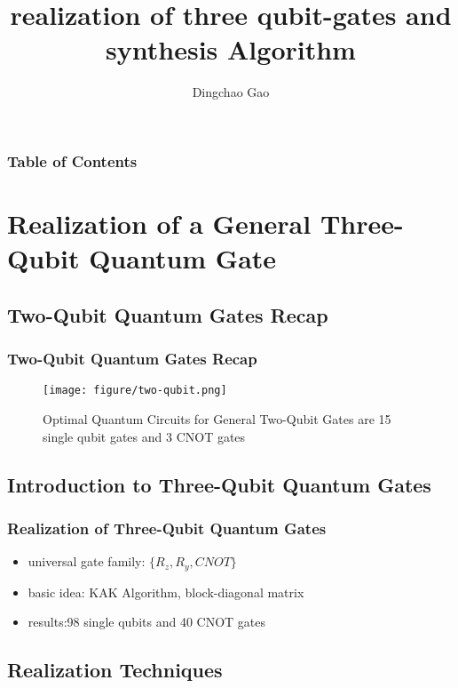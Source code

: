 \documentclass[aspectratio=1610]{beamer}
\title[gates \& synthesis]{realization of three qubit-gates and synthesis Algorithm}
\author[Gcc]{Dingchao Gao}
\institute[ISCAS]{Institute of Software Chinese Academy of Sciences}
\begin{document}
\frame{\titlepage}

\begin{frame}
\frametitle{Table of Contents}
\tableofcontents[hideallsubsections]
\end{frame}


\section{Realization of a General Three-Qubit Quantum Gate}
\subsection{Two-Qubit Quantum Gates Recap}
\begin{frame}
\frametitle{Two-Qubit Quantum Gates Recap}
\begin{figure}
  \texttt{[image: figure/two-qubit.png]}
  \caption{Optimal Quantum Circuits for General Two-Qubit Gates are 15 single qubit gates and 3 CNOT gates\cite{two}}
\end{figure}
\end{frame}

\subsection{Introduction to Three-Qubit Quantum Gates}
\begin{frame}
\frametitle{Realization of Three-Qubit Quantum Gates}
\begin{itemize}
  \item universal gate family: $\{R_z,R_y,CNOT\}$
  \item basic idea: KAK Algorithm\cite{kak}, block-diagonal matrix
  \item results:98 single qubits and 40 CNOT gates
\end{itemize}
\end{frame}

\subsection{Realization Techniques}
\end{document}
